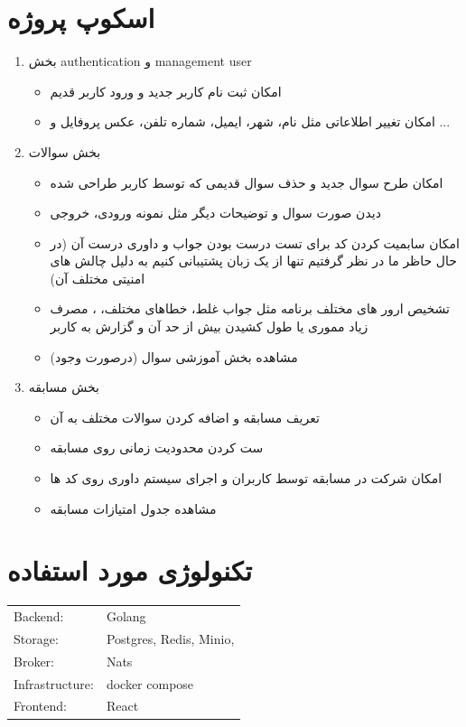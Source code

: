 \documentclass{article}
\begin{document}
	\section{اسکوپ پروژه}
	\begin{enumerate}
		\item بخش authentication  و management user
			\begin{itemize}
				\item امکان ثبت نام کاربر جدید و ورود کاربر قدیم
				\item امکان تغییر اطلاعاتی مثل نام، شهر، ایمیل، شماره تلفن، عکس پروفایل و ...
			\end{itemize}
		\item بخش  سوالات
			\begin{itemize}
				\item امکان طرح سوال جدید و حذف سوال قدیمی که توسط کاربر طراحی شده
				\item دیدن صورت سوال و توضیحات دیگر مثل نمونه ورودی، خروجی 
				\item امکان سابمیت کردن کد برای تست درست بودن جواب و داوری درست آن (در حال حاظر ما در نظر گرفتیم تنها از یک زبان پشتیبانی کنیم به دلیل چالش های امنیتی مختلف آن)
				\item تشخیص ارور های مختلف برنامه مثل جواب غلط، خطاهای مختلف، ، مصرف زیاد مموری یا طول کشیدن بیش از حد آن و گزارش به کاربر
				\item مشاهده بخش آموزشی سوال (درصورت وجود)
			\end{itemize}
		\item بخش مسابقه
		\begin{itemize}
			\item تعریف مسابقه و اضافه کردن سوالات مختلف به آن
			\item ست کردن محدودیت زمانی روی مسابقه
			\item امکان شرکت در مسابقه توسط کاربران و اجرای سیستم داوری روی کد ها
			\item مشاهده جدول امتیازات مسابقه
		\end{itemize}
	\end{enumerate}
	
	\section{تکنولوژی مورد استفاده}
		\begin{LTR}
			\begin{tabular}{ l l }
				Backend: & Golang \\
				Storage: & Postgres, Redis,  Minio, \\
				Broker: & Nats \\
				Infrastructure: & docker compose \\
				Frontend: & React
			\end{tabular}
		\end{LTR}
		
\end{document}
